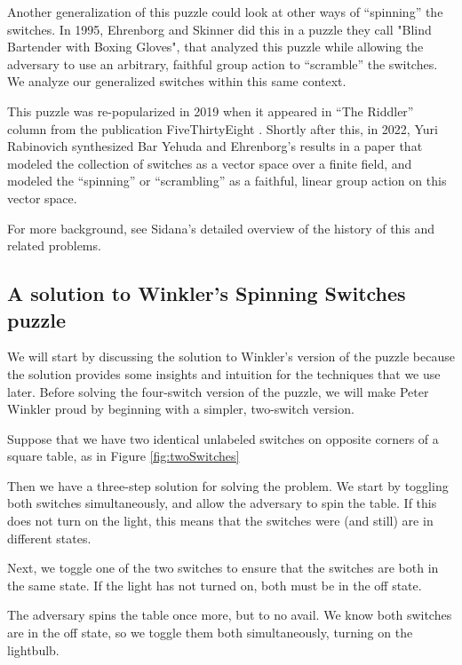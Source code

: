 Another generalization of this puzzle could look at other ways of ``spinning''
the switches. In 1995, Ehrenborg and Skinner \cite{Ehrenborg1995} did this
in a puzzle they call "Blind Bartender with Boxing Gloves", that analyzed
this puzzle while allowing the adversary to use an arbitrary, faithful group action
to ``scramble'' the switches. We analyze our generalized switches within this
same context.

This puzzle was re-popularized in 2019 when it appeared in ``The Riddler''
column from the publication FiveThirtyEight \cite{FiveThirtyEight}.
Shortly after this, in 2022, Yuri Rabinovich synthesized Bar Yehuda and Ehrenborg's
results in a paper that modeled the collection of switches as a vector space
over a finite field, and modeled the ``spinning'' or ``scrambling'' as a
faithful, linear group action on this vector space.

For more background, see Sidana's \cite{Sidana2020} detailed overview of the
history of this and related problems.

\subsection{A solution to Winkler's Spinning Switches puzzle}

We will start by discussing the solution to Winkler's version of the puzzle
because the solution provides some insights and intuition for the techniques
that we use later. Before solving the four-switch version of the puzzle,
we will make Peter Winkler proud by beginning with a simpler, two-switch version.

\begin{example}
  Suppose that we have two identical unlabeled switches on opposite corners
  of a square table, as in Figure \ref{fig:twoSwitches}

  Then we have a three-step solution for solving the problem.
  We start by toggling both switches simultaneously, and allow the adversary
  to spin the table.
  If this does not turn on the light,
  this means that the switches were (and still) are in different states.

  Next, we toggle one of the two switches
  to ensure that the switches are both in the same state. If the light has not
  turned on, both must be in the off state.

  The adversary spins the table once more, but to no avail. We know both
  switches are in the off state, so we toggle them both simultaneously, turning
  on the lightbulb.
\end{example}

